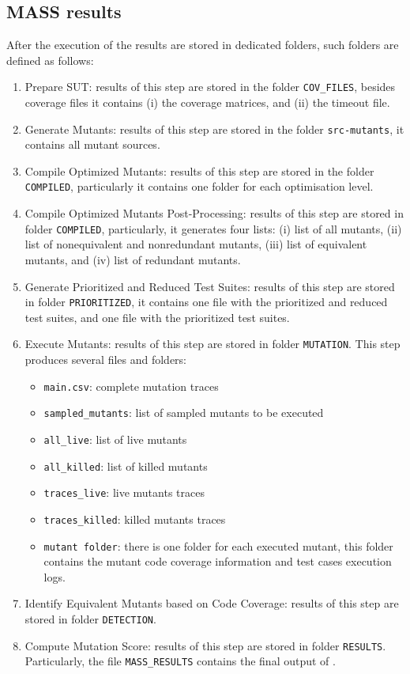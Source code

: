 \subsection{MASS results}

After the execution of \MASS the results are stored in dedicated folders, such folders are defined as follows:

\begin{enumerate}
	\item Prepare SUT: results of this step are stored in the folder \texttt{COV\_FILES}, besides coverage files it contains (i) the coverage matrices, and (ii) the timeout file.
	\item Generate Mutants: results of this step are stored in the folder \texttt{src-mutants}, it contains all mutant sources.
	\item Compile Optimized Mutants: results of this step are stored in the folder \texttt{COMPILED}, particularly it contains one folder for each optimisation level.
	\item Compile Optimized Mutants Post-Processing: results of this step are stored in folder \texttt{COMPILED}, particularly, it generates four lists: (i) list of all mutants, (ii) list of nonequivalent and nonredundant mutants, (iii) list of equivalent mutants, and (iv) list of redundant mutants.
	\item Generate Prioritized and Reduced Test Suites: results of this step are stored in folder \texttt{PRIORITIZED}, it contains one file with the prioritized and reduced test suites, and one file with the prioritized test suites.
	\item Execute Mutants: results of this step are stored in folder \texttt{MUTATION}. This step produces several files and folders:
	\begin{itemize}
		\item \texttt{main.csv}: complete mutation traces
		\item \texttt{sampled\_mutants}: list of sampled mutants to be executed
		\item \texttt{all\_live}: list of live mutants
		\item \texttt{all\_killed}: list of killed mutants
		\item \texttt{traces\_live}: live mutants traces
		\item \texttt{traces\_killed}: killed mutants traces
		\item \texttt{mutant folder}: there is one folder for each executed mutant, this folder contains the mutant code coverage information and test cases execution logs.
	\end{itemize}
	\item Identify Equivalent Mutants based on Code Coverage: results of this step are stored in folder \texttt{DETECTION}.
	\item Compute Mutation Score: results of this step are stored in folder \texttt{RESULTS}. Particularly, the file \texttt{MASS\_RESULTS} contains the final output of \MASS.
\end{enumerate}


